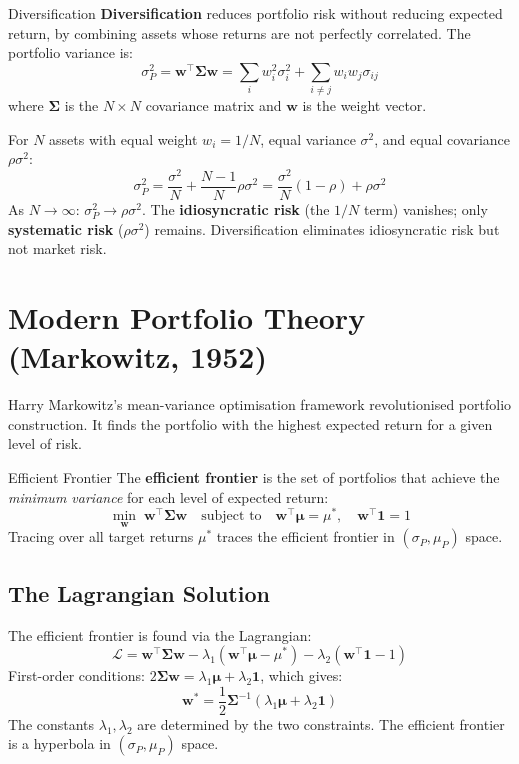 \documentclass[12pt,a4paper,openany]{report}
\theoremstyle{definition}
\begin{document}
\begin{definitionbox}{Diversification}
\textbf{Diversification} reduces portfolio risk without reducing expected return, by combining assets whose returns are not perfectly correlated. The portfolio variance is:
\[
  \sigma_P^2 = \mathbf{w}^\top \boldsymbol{\Sigma} \mathbf{w} = \sum_i w_i^2 \sigma_i^2 + \sum_{i\neq j} w_i w_j \sigma_{ij}
\]
where $\boldsymbol{\Sigma}$ is the $N\times N$ covariance matrix and $\mathbf{w}$ is the weight vector.
\end{definitionbox}

For $N$ assets with equal weight $w_i = 1/N$, equal variance $\sigma^2$, and equal covariance $\rho\sigma^2$:
\begin{equation}
  \sigma_P^2 = \frac{\sigma^2}{N} + \frac{N-1}{N}\rho\sigma^2 = \frac{\sigma^2}{N}(1-\rho) + \rho\sigma^2
\end{equation}
As $N \to \infty$: $\sigma_P^2 \to \rho\sigma^2$. The \textbf{idiosyncratic risk} (the $1/N$ term) vanishes; only \textbf{systematic risk} ($\rho\sigma^2$) remains. Diversification eliminates idiosyncratic risk but not market risk.

\section{Modern Portfolio Theory (Markowitz, 1952)}

Harry Markowitz's mean-variance optimisation framework revolutionised portfolio construction. It finds the portfolio with the highest expected return for a given level of risk.

\begin{definitionbox}{Efficient Frontier}
The \textbf{efficient frontier} is the set of portfolios that achieve the \emph{minimum variance} for each level of expected return:
\[
  \min_{\mathbf{w}} \; \mathbf{w}^\top\boldsymbol{\Sigma}\mathbf{w} \quad \text{subject to} \quad \mathbf{w}^\top\boldsymbol{\mu} = \mu^*, \quad \mathbf{w}^\top\mathbf{1} = 1
\]
Tracing over all target returns $\mu^*$ traces the efficient frontier in $(\sigma_P, \mu_P)$ space.
\end{definitionbox}

\subsection{The Lagrangian Solution}

The efficient frontier is found via the Lagrangian:
\begin{equation}
  \mathcal{L} = \mathbf{w}^\top\boldsymbol{\Sigma}\mathbf{w} - \lambda_1(\mathbf{w}^\top\boldsymbol{\mu} - \mu^*) - \lambda_2(\mathbf{w}^\top\mathbf{1} - 1)
\end{equation}
First-order conditions: $2\boldsymbol{\Sigma}\mathbf{w} = \lambda_1\boldsymbol{\mu} + \lambda_2\mathbf{1}$, which gives:
\begin{equation}
  \mathbf{w}^* = \frac{1}{2}\boldsymbol{\Sigma}^{-1}(\lambda_1\boldsymbol{\mu} + \lambda_2\mathbf{1})
\end{equation}
The constants $\lambda_1, \lambda_2$ are determined by the two constraints. The efficient frontier is a hyperbola in $(\sigma_P, \mu_P)$ space.
\end{document}
